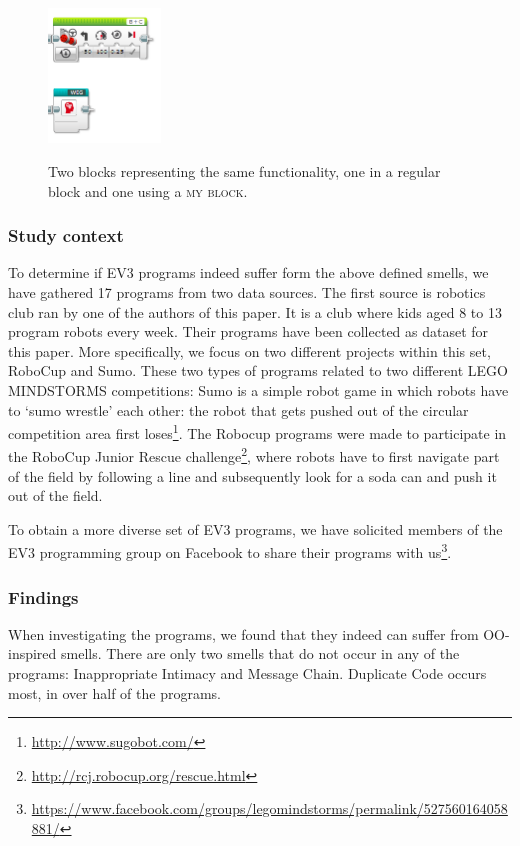 \documentclass{sig-alternate}
\newcommand{\mb}{\textsc{my block}}
\begin{document}
\begin{figure} [ht]
\caption{Two blocks representing the same functionality, one in a regular block and one using a \mb.}
\centering
\includegraphics[width=3cm]{img/weg}
\label{fig:weg}
\end{figure}

\subsubsection{Study context}
To determine if EV3 programs indeed suffer form the above defined smells, we have gathered 17 programs from two data sources. The first source is robotics club ran by one of the authors of this paper. It is a club where kids aged 8 to 13 program robots every week. Their programs have been collected as dataset for this paper. More specifically, we focus on two different projects within this set, RoboCup and Sumo. These two types of programs related to two different LEGO MINDSTORMS competitions: Sumo is a simple robot game in which robots have to `sumo wrestle' each other: the robot that gets pushed out of the circular competition area first loses\footnote{\url{http://www.sugobot.com/}}. The Robocup programs were made to participate in the RoboCup Junior Rescue challenge\footnote{\url{http://rcj.robocup.org/rescue.html}}, where robots have to first navigate part of the field by following a line and subsequently look for a soda can and push it out of the field.

To obtain a more diverse set of EV3 programs, we have solicited members of the EV3 programming group on Facebook to share their programs with us\footnote{\url{https://www.facebook.com/groups/legomindstorms/permalink/527560164058881/}}.

\subsubsection{Findings}
When investigating the programs, we found that they indeed can suffer from OO-inspired smells. There are only two smells that do not occur in any of the programs: Inappropriate Intimacy and Message Chain. Duplicate Code occurs most, in over half of the programs. 
\end{document}
